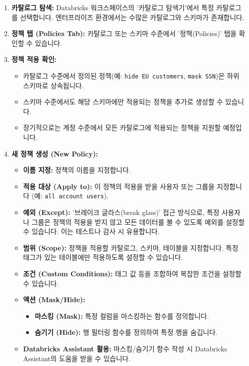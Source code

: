 \documentclass[11pt,a4paper]{article}
\begin{document}
\begin{enumerate}
    \item \textbf{카탈로그 탐색:} Databricks 워크스페이스의 '카탈로그 탐색기'에서 특정 카탈로그를 선택합니다. 엔터프라이즈 환경에서는 수많은 카탈로그와 스키마가 존재합니다.
    \item \textbf{정책 탭 (Policies Tab):} 카탈로그 또는 스키마 수준에서 '정책(Policies)' 탭을 확인할 수 있습니다.
    \item \textbf{정책 적용 확인:}
    \begin{itemize}
        \item 카탈로그 수준에서 정의된 정책(예: \texttt{hide EU customers}, \texttt{mask SSN})은 하위 스키마로 상속됩니다.
        \item 스키마 수준에서도 해당 스키마에만 적용되는 정책을 추가로 생성할 수 있습니다.
        \item 장기적으로는 계정 수준에서 모든 카탈로그에 적용되는 정책을 지원할 예정입니다.
    \end{itemize}
    \item \textbf{새 정책 생성 (New Policy):}
    \begin{itemize}
        \item \textbf{이름 지정:} 정책의 이름을 지정합니다.
        \item \textbf{적용 대상 (Apply to):} 이 정책의 적용을 받을 사용자 또는 그룹을 지정합니다 (예: \texttt{all account users}).
        \item \textbf{예외 (Except):} '브레이크 글라스(break glass)' 접근 방식으로, 특정 사용자나 그룹은 정책의 적용을 받지 않고 모든 데이터를 볼 수 있도록 예외를 설정할 수 있습니다. 이는 테스트나 감사 시 유용합니다.
        \item \textbf{범위 (Scope):} 정책을 적용할 카탈로그, 스키마, 테이블을 지정합니다. 특정 태그가 있는 테이블에만 적용하도록 설정할 수 있습니다.
        \item \textbf{조건 (Custom Conditions):} 태그 값 등을 조합하여 복잡한 조건을 설정할 수 있습니다.
        \item \textbf{액션 (Mask/Hide):}
        \begin{itemize}
            \item \textbf{마스킹 (Mask):} 특정 컬럼을 마스킹하는 함수를 정의합니다.
            \item \textbf{숨기기 (Hide):} 행 필터링 함수를 정의하여 특정 행을 숨깁니다.
        \end{itemize}
        \item \textbf{Databricks Assistant 활용:} 마스킹/숨기기 함수 작성 시 Databricks Assistant의 도움을 받을 수 있습니다.

\end{itemize}
\end{enumerate}
\end{document}
